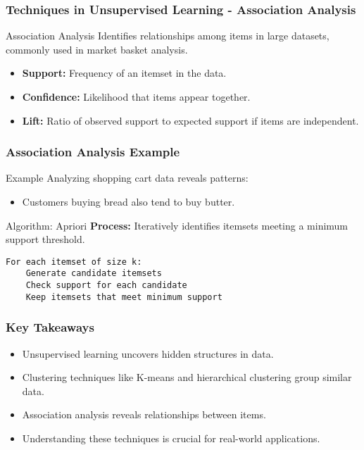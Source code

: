 \documentclass[aspectratio=169]{beamer}
\begin{document}
\begin{frame}[fragile]
    \frametitle{Techniques in Unsupervised Learning - Association Analysis}
    \begin{block}{Association Analysis}
        Identifies relationships among items in large datasets, commonly used in market basket analysis.
    \end{block}
    \begin{itemize}
        \item \textbf{Support:} Frequency of an itemset in the data.
        \item \textbf{Confidence:} Likelihood that items appear together.
        \item \textbf{Lift:} Ratio of observed support to expected support if items are independent.
    \end{itemize}
\end{frame}

\begin{frame}[fragile]
    \frametitle{Association Analysis Example}
    \begin{block}{Example}
        Analyzing shopping cart data reveals patterns:
        \begin{itemize}
            \item Customers buying bread also tend to buy butter.
        \end{itemize}
    \end{block}
    \begin{block}{Algorithm: Apriori}
        \textbf{Process:} Iteratively identifies itemsets meeting a minimum support threshold.
    \end{block}
    \begin{lstlisting}
For each itemset of size k:
    Generate candidate itemsets
    Check support for each candidate
    Keep itemsets that meet minimum support
    \end{lstlisting}
\end{frame}

\begin{frame}[fragile]
    \frametitle{Key Takeaways}
    \begin{itemize}
        \item Unsupervised learning uncovers hidden structures in data.
        \item Clustering techniques like K-means and hierarchical clustering group similar data.
        \item Association analysis reveals relationships between items.
        \item Understanding these techniques is crucial for real-world applications.
    \end{itemize}
\end{frame}
\end{document}
